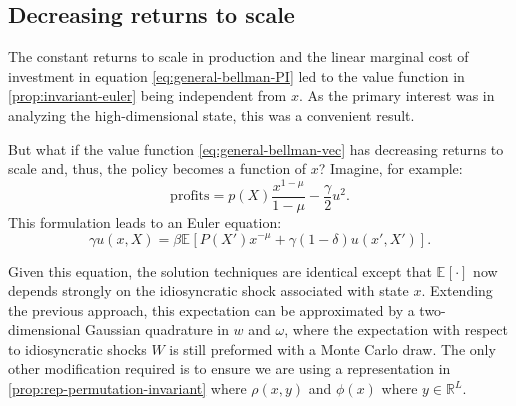 \documentclass[12pt]{article}
\newcommand{\expec}[2][]{\ensuremath{\mathbb{E}_{{#1}}\left[ {#2} \right]}}
\newcommand{\mapvar}[2][map]{\csname #1#2\endcsname}
\begin{document}
\subsection{Decreasing returns to scale}\label{sec:curvature-revenue-function}

The constant returns to scale in production and the linear marginal cost of investment in equation \cref{eq:general-bellman-PI} led to the value function in \cref{prop:invariant-euler} being independent from $x$. As the primary interest was in analyzing the high-dimensional state, this was a convenient result.

But what if the value function \cref{eq:general-bellman-vec} has decreasing returns to scale and, thus, the policy becomes a function of $x$? Imagine, for example:
\begin{equation*}
\text{profits} = p(X)\frac{x^{1-\mu}}{1-\mu}-\frac{\gamma}{2}u^2.
\end{equation*}
This formulation leads to an Euler equation:
\begin{equation*}
\gamma u(x,X) = \beta \expec{P(X')x^{-\mu}+\gamma (1-\delta) u(x',X') }.
\end{equation*}

Given this equation, the solution techniques are identical except that $\expec{\cdot}$ now depends strongly on the idiosyncratic shock associated with state $x$. Extending the previous approach, this expectation can be approximated by a two-dimensional Gaussian quadrature in $w$ and $\omega$, where the expectation with respect to idiosyncratic shocks $W$ is still preformed with a Monte Carlo draw. The only other modification required is to ensure we are using a representation in \cref{prop:rep-permutation-invariant} where $\rho(x, y)$ and $\phi(x)$ where $y \in \mathbb{R}^L$.


\end{document}
